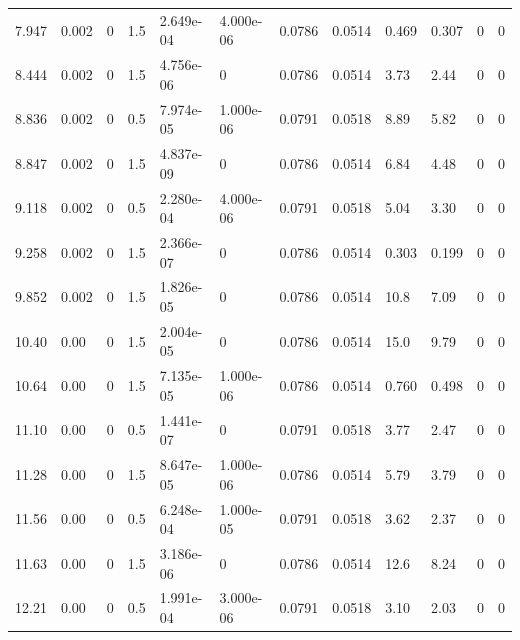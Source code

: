 \documentclass[preview]{standalone}
\begin{document}
{{\begin{tabular}{L{1.2cm}C{1.2cm} C{0.3cm}C{0.5cm} C{1.4cm}C{1.4cm} C{1.4cm}C{1.4cm} C{1.6cm}C{1.6cm} C{1.6cm}C{1.6cm}}
  7.947  &  0.002  & 0     & 1.5 &  2.649e-04  & 4.000e-06  &  0.0786&   0.0514& 0.469 & 0.307   &  0 & 0  \\ 
  8.444  &  0.002  & 0     & 1.5 &  4.756e-06  & 0  &  0.0786&   0.0514& 3.73 & 2.44   &  0 & 0  \\ 
  8.836  &  0.002  & 0     & 0.5 &  7.974e-05  & 1.000e-06  &  0.0791&   0.0518& 8.89 & 5.82   &  0 & 0  \\ 
  8.847  &  0.002  & 0     & 1.5 &  4.837e-09  & 0  &  0.0786&   0.0514& 6.84 & 4.48   &  0 & 0  \\ 
  9.118  &  0.002  & 0     & 0.5 &  2.280e-04  & 4.000e-06  &  0.0791&   0.0518& 5.04 & 3.30   &  0 & 0  \\ 
  9.258  &  0.002  & 0     & 1.5 &  2.366e-07  & 0  &  0.0786&   0.0514& 0.303 & 0.199   &  0 & 0  \\ 
  9.852  &  0.002  & 0     & 1.5 &  1.826e-05  & 0  &  0.0786&   0.0514& 10.8 & 7.09   &  0 & 0  \\ 
  10.40  &  0.00  & 0     & 1.5 &  2.004e-05  & 0  &  0.0786&   0.0514& 15.0 & 9.79   &  0 & 0  \\ 
  10.64  &  0.00  & 0     & 1.5 &  7.135e-05  & 1.000e-06  &  0.0786&   0.0514& 0.760 & 0.498   &  0 & 0  \\ 
  11.10  &  0.00  & 0     & 0.5 &  1.441e-07  & 0  &  0.0791&   0.0518& 3.77 & 2.47   &  0 & 0  \\ 
  11.28  &  0.00  & 0     & 1.5 &  8.647e-05  & 1.000e-06  &  0.0786&   0.0514& 5.79 & 3.79   &  0 & 0  \\ 
  11.56  &  0.00  & 0     & 0.5 &  6.248e-04  & 1.000e-05  &  0.0791&   0.0518& 3.62 & 2.37   &  0 & 0  \\ 
  11.63  &  0.00  & 0     & 1.5 &  3.186e-06  & 0  &  0.0786&   0.0514& 12.6 & 8.24   &  0 & 0  \\ 
  12.21  &  0.00  & 0     & 0.5 &  1.991e-04  & 3.000e-06  &  0.0791&   0.0518& 3.10 & 2.03   &  0 & 0  \\ 
\hline 
\end{tabular} 

}}
\end{document}
